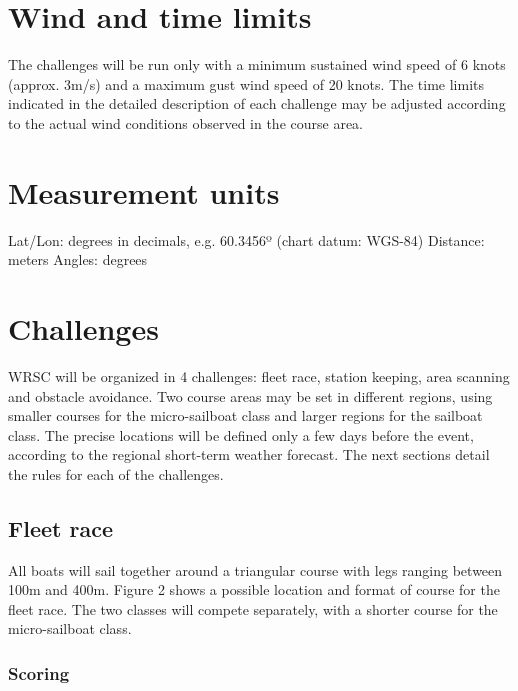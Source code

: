 \documentclass[12pt]{article}
\begin{document}
\section{Wind and time limits}
The challenges will be run only with a minimum sustained wind speed of 6 knots
(approx. 3m/s)
and a maximum gust wind speed of 20 knots. The time limits indicated in the
detailed
description of each challenge may be adjusted according to the actual wind
conditions observed
in the course area.

\section{Measurement units}
Lat/Lon: degrees in decimals, e.g. 60.3456º (chart datum: WGS-84)
Distance: meters
Angles: degrees

\section{Challenges}
WRSC will be organized in 4 challenges: fleet race, station keeping, area
scanning and obstacle avoidance.
Two course areas may be set in different regions, using smaller courses for the
micro-sailboat
class and larger regions for the sailboat class. The precise locations will be
defined only a few
days before the event, according to the regional short-term weather forecast.
The next sections
detail the rules for each of the challenges.

\subsection{Fleet race}

All boats will sail together around a triangular course with legs ranging
between 100m and
400m. Figure 2 shows a possible location and format of course for the fleet
race. The two
classes will compete separately, with a shorter course for the micro-sailboat
class.
\subsubsection{Scoring}
\end{document}
